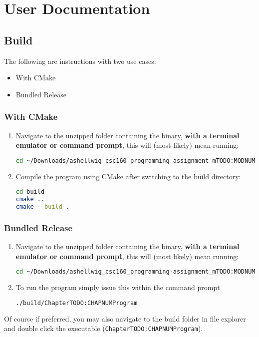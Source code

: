 \documentclass[a4paper,11pt]{article}
\begin{document}
  \section{User Documentation}

    \subsection{Build}
      The following are instructions with two use cases:
      \begin{itemize}
        \item With CMake
        \item Bundled Release
      \end{itemize}
      \subsubsection{With CMake}
        \begin{enumerate}
          \item Navigate to the unzipped folder containing the binary,
            \textbf{with a terminal emulator or command prompt}, this will
            (most likely) mean running:
            \begin{lstlisting}[language=bash]
cd ~/Downloads/ashellwig_csc160_programming-assignment_mTODO:MODNUMcTODO:CHAPNUM
            \end{lstlisting}
          \item Compile the program using CMake after switching to the build
            directory:
            \begin{lstlisting}[language=bash]
cd build
cmake ..
cmake --build .
            \end{lstlisting}
          \end{enumerate}
      \subsubsection{Bundled Release}
        \begin{enumerate}
          \item Navigate to the unzipped folder containing the binary,
            \textbf{with a terminal emulator or command prompt}, this will
            (most likely) mean running:
            \begin{lstlisting}[language=bash]
cd ~/Downloads/ashellwig_csc160_programming-assignment_mTODO:MODNUMcTODO:CHAPNUM
            \end{lstlisting}
          \item To run the program simply issue this within the command
            prompt
            \begin{lstlisting}[language=bash]
./build/ChapterTODO:CHAPNUMProgram
            \end{lstlisting}
        \end{enumerate}
        Of course if preferred, you may also navigate to the build folder in
          file explorer and double click the executable
          (\texttt{ChapterTODO:CHAPNUMProgram}).
\end{document}
